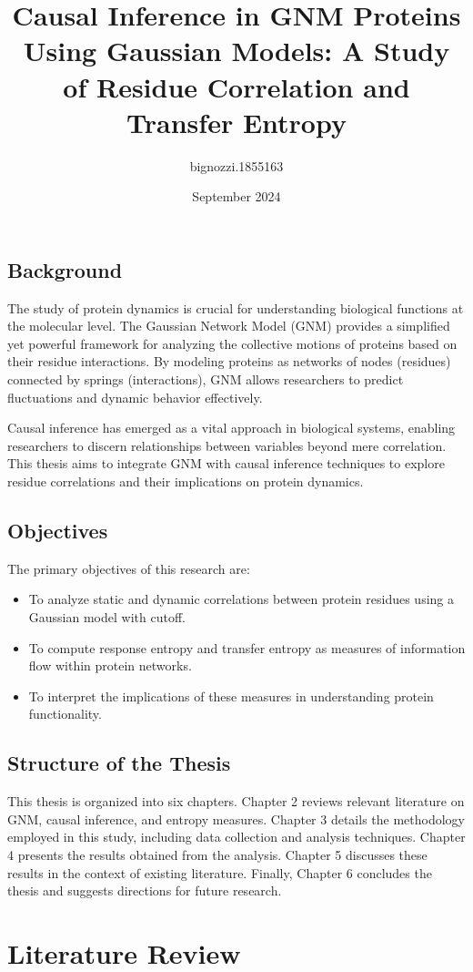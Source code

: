 \documentclass{report}  %
\title{Causal Inference in GNM Proteins Using Gaussian Models: A Study of Residue Correlation and Transfer Entropy}
\author{bignozzi.1855163 }
\date{September 2024}
\begin{document}
\maketitle


\section{Background}
The study of protein dynamics is crucial for understanding biological functions at the molecular level. The Gaussian Network Model (GNM) provides a simplified yet powerful framework for analyzing the collective motions of proteins based on their residue interactions. By modeling proteins as networks of nodes (residues) connected by springs (interactions), GNM allows researchers to predict fluctuations and dynamic behavior effectively.

Causal inference has emerged as a vital approach in biological systems, enabling researchers to discern relationships between variables beyond mere correlation. This thesis aims to integrate GNM with causal inference techniques to explore residue correlations and their implications on protein dynamics.

\section{Objectives}
The primary objectives of this research are:
\begin{itemize}
    \item To analyze static and dynamic correlations between protein residues using a Gaussian model with cutoff.
    \item To compute response entropy and transfer entropy as measures of information flow within protein networks.
    \item To interpret the implications of these measures in understanding protein functionality.
\end{itemize}

\section{Structure of the Thesis}
This thesis is organized into six chapters. Chapter 2 reviews relevant literature on GNM, causal inference, and entropy measures. Chapter 3 details the methodology employed in this study, including data collection and analysis techniques. Chapter 4 presents the results obtained from the analysis. Chapter 5 discusses these results in the context of existing literature. Finally, Chapter 6 concludes the thesis and suggests directions for future research.

\chapter{Literature Review}
\end{document}
